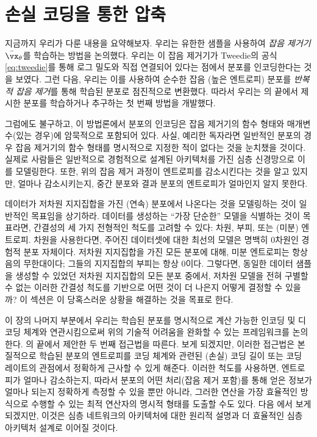 \documentclass[../../book-main_ko.tex]{subfiles}
\begin{document}
\section{손실 코딩을 통한 압축}\label{sec:lossy_compression}

지금까지 우리가 다룬 내용을 요약해보자. 우리는 유한한 샘플을 사용하여 \textit{잡음 제거기} \(\bar{\vx}_{\theta}\)를 학습하는 방법을 논의했다. 우리는 이 잡음 제거기가 Tweedie의 공식 \eqref{eq:tweedie}를 통해 로그 밀도와 직접 연결되어 있다는 점에서 분포를 인코딩한다는 것을 보였다. 그런 다음, 우리는 이를 사용하여 순수한 잡음 (높은 엔트로피) 분포를 \textit{반복적 잡음 제거}를 통해 학습된 분포로 점진적으로 변환했다. 따라서 우리는 의 끝에서 제시한 분포를 학습하거나 추구하는 첫 번째 방법을 개발했다.

그럼에도 불구하고, 이 방법론에서 분포의 인코딩은 잡음 제거기의 함수 형태와 매개변수(있는 경우)에 암묵적으로 포함되어 있다. 사실, 예리한 독자라면 일반적인 분포의 경우 잡음 제거기의 함수 형태를 명시적으로 지정한 적이 없다는 것을 눈치챘을 것이다. 실제로 사람들은 일반적으로 경험적으로 설계된 아키텍처를 가진 심층 신경망으로 이를 모델링한다. 또한, 위의 잡음 제거 과정이 엔트로피를 감소시킨다는 것을 알고 있지만, 얼마나 감소시키는지, 중간 분포와 결과 분포의 엔트로피가 얼마인지 알지 못한다.

데이터가 저차원 지지집합을 가진 (연속) 분포에서 나온다는 것을 모델링하는 것이 일반적인 목표임을 상기하라. 데이터를 생성하는 ``가장 단순한'' 모델을 식별하는 것이 목표라면, 간결성의 세 가지 전형적인 척도를 고려할 수 있다: 차원, 부피, 또는 (미분) 엔트로피. 차원을 사용한다면, 주어진 데이터셋에 대한 최선의 모델은 명백히 0차원인 경험적 분포 자체이다. 저차원 지지집합을 가진 모든 분포에 대해, 미분 엔트로피는 항상 음의 무한대이다; 그들의 지지집합의 부피는 항상 0이다. 그렇다면, 동일한 데이터 샘플을 생성할 수 있었던 저차원 지지집합의 모든 분포 중에서, 저차원 모델을 전혀 구별할 수 없는 이러한 간결성 척도를 기반으로 어떤 것이 더 나은지 어떻게 결정할 수 있을까? 이 섹션은 이 당혹스러운 상황을 해결하는 것을 목표로 한다.

이 장의 나머지 부분에서 우리는 학습된 분포를 명시적으로 계산 가능한 인코딩 및 디코딩 체계와 연관시킴으로써 위의 기술적 어려움을 완화할 수 있는 프레임워크를 논의한다. 의 끝에서 제안한 두 번째 접근법을 따른다. 보게 되겠지만, 이러한 접근법은 본질적으로 학습된 분포의 엔트로피를 코딩 체계와 관련된 (손실) 코딩 길이 또는 코딩 레이트의 관점에서 정확하게 근사할 수 있게 해준다. 이러한 척도를 사용하면, 엔트로피가 얼마나 감소하는지, 따라서 분포의 어떤 처리(잡음 제거 포함)를 통해 얻은 정보가 얼마나 되는지 정확하게 측정할 수 있을 뿐만 아니라, 그러한 연산을 가장 효율적인 방식으로 수행할 수 있는 최적 연산자의 명시적 형태를 도출할 수도 있다. 다음 에서 보게 되겠지만, 이것은 심층 네트워크의 아키텍처에 대한 원리적 설명과 더 효율적인 심층 아키텍처 설계로 이어질 것이다.
\end{document}
